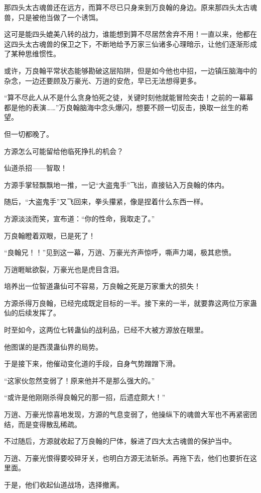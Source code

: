 \begin{this_body}
那四头太古魂兽还在远方，而算不尽已只身来到万良翰的身边。原来那四头太古魂兽，只是被他当做了一个诱饵。

这可是能四头媲美八转的战力，谁能想到算不尽居然舍弃不用！一直以来，他都在这四头太古魂兽的保卫之下，不断地给予万家三仙诸多心理暗示，让他们逐渐形成了某种思维惯性。

或许，万良翰平常状态能够勘破这层陷阱，但是如今他也中招，一边镇压脑海中的杂念，一边还要顾及万豪光、万逍的安危，早已无法想得更多。

“算不尽此人从不是什么贪身怕死之徒，关键时刻他就能冒险突击！之前的一幕幕都是他的表演……”万良翰脑海中念头爆闪，想要不顾一切反击，换取一丝生的希望。

但一切都晚了。

方源怎么可能留给他临死挣扎的机会？

仙道杀招——智取！

方源手掌轻飘飘地一推，一记“大盗鬼手”飞出，直接钻入万良翰的体内。

随后，“大盗鬼手”又飞回来，拳头攥紧，像是捏着什么东西一样。

方源淡淡而笑，宣布道：“你的性命，我取走了。”

万良翰瞪着双眼，已是死了！

“良翰兄！！”见到这一幕，万逍、万豪光齐声惊呼，嘶声力竭，极其悲愤。

万逍睚眦欲裂，万豪光也是虎目含泪。

培养出一位智道蛊仙可不容易，万良翰之死是万家重大的损失！

方源杀得万良翰，已经完成既定目标的一半。接下来的一半，就要靠这两位万家蛊仙的后续发挥了。

时至如今，这两位七转蛊仙的战利品，已经不大被方源放在眼里。

他图谋的是西漠蛊仙界的局势。

于是接下来，他催动变化道的手段，自身气势蹭蹭下滑。

“这家伙忽然变弱了！原来他并不是那么强大的。”

“或许是他刚刚杀得良翰兄的那一招，后遗症颇大！”

万逍、万豪光惊喜地发现，方源的气息变弱了，他操纵下的魂兽大军也不再紧密团结，而是变得散乱稀疏。

不过随后，方源就收起了万良翰的尸体，躲进了四大太古魂兽的保护当中。

万逍、万豪光恨得要咬碎牙关，也明白方源无法斩杀。再拖下去，他们也要折在这里面。

于是，他们收起仙道战场，选择撤离。


\end{this_body}

